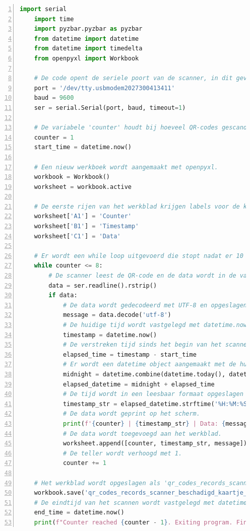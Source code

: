 \begin{lstlisting}[language=Python, caption={Python script voor experiment van nieuwe QR-code scanner \autocite{LockitRentals}.}, label=lst:nieuweQR-codeData, numbers=left]
    import serial
    import time
    import pyzbar.pyzbar as pyzbar
    from datetime import datetime
    from datetime import timedelta
    from openpyxl import Workbook
    
    # De code opent de seriele poort van de scanner, in dit geval '/dev/tty.usbmodem2027300413411', op een baudrate van 9600
    port = '/dev/tty.usbmodem2027300413411'
    baud = 9600
    ser = serial.Serial(port, baud, timeout=1)
    
    # De variabele 'counter' houdt bij hoeveel QR-codes gescand zijn. De starttijd wordt vastgelegd met datetime.now().
    counter = 1
    start_time = datetime.now()
    
    # Een nieuw werkboek wordt aangemaakt met openpyxl.
    workbook = Workbook()
    worksheet = workbook.active
    
    # De eerste rijen van het werkblad krijgen labels voor de kolommen.
    worksheet['A1'] = 'Counter'
    worksheet['B1'] = 'Timestamp'
    worksheet['C1'] = 'Data'
    
    # Er wordt een while loop uitgevoerd die stopt nadat er 10 QR-codes zijn gescand.
    while counter <= 8:
        # De scanner leest de QR-code en de data wordt in de variabele 'data' opgeslagen.
        data = ser.readline().rstrip()
        if data:
            # De data wordt gedecodeerd met UTF-8 en opgeslagen in de variabele 'message'.
            message = data.decode('utf-8')
            # De huidige tijd wordt vastgelegd met datetime.now().
            timestamp = datetime.now()
            # De verstreken tijd sinds het begin van het scannen wordt berekend.
            elapsed_time = timestamp - start_time
            # Er wordt een datetime object aangemaakt met de huidige datum en de verstreken tijd.
            midnight = datetime.combine(datetime.today(), datetime.min.time())
            elapsed_datetime = midnight + elapsed_time
            # De tijd wordt in een leesbaar formaat opgeslagen in de variabele 'timestamp_str'.
            timestamp_str = elapsed_datetime.strftime('%H:%M:%S:%f')[:-3]
            # De data wordt geprint op het scherm.
            print(f'{counter} | {timestamp_str} | Data: {message}')
            # De data wordt toegevoegd aan het werkblad.
            worksheet.append([counter, timestamp_str, message])
            # De teller wordt verhoogd met 1.
            counter += 1
    
    # Het werkblad wordt opgeslagen als 'qr_codes_records_scanner.xlsx'.
    workbook.save('qr_codes_records_scanner_beschadigd_kaartje_120lux.xlsx')
    # De eindtijd van het scannen wordt vastgelegd met datetime.now() en geprint op het scherm.
    end_time = datetime.now()
    print(f"Counter reached {counter - 1}. Exiting program. Final time of scanning: {end_time - start_time}")
\end{lstlisting}

